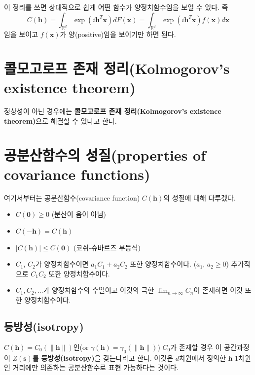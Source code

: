 \documentclass[b5paper,]{book}
\theoremstyle{definition}
\theoremstyle{definition}
\theoremstyle{definition}
\theoremstyle{remark}
\begin{document}
이 정리를 쓰면 상대적으로 쉽게 어떤 함수가 양정치함수임을 보일 수 있다.
즉 \[
C(\mathbf{h}) =\int_{\mathbb{R}^{d}}\exp(i\mathbf{h}^{T}\mathbf{x})dF(\mathbf{x})
=\int_{\mathbb{R}^{d}}\exp(i\mathbf{h}^{T}\mathbf{x})f(\mathbf{x})d\mathbf{x}
\] 임을 보이고 \(f(\mathbf{x})\)가 양(positive)임을 보이기만 하면 된다.

\section{콜모고로프 존재 정리(Kolmogorov's existence
theorem)}\label{--kolmogorovs-existence-theorem}

정상성이 아닌 경우에는 \textbf{콜모고로프 존재 정리(Kolmogorov's
existence theorem)}으로 해결할 수 있다고 한다.

\section{공분산함수의 성질(properties of covariance
functions)}\label{-properties-of-covariance-functions}

여기서부터는 공분산함수(covariance function) \(C(\mathbf{h})\)의 성질에
대해 다루겠다.

\begin{itemize}
\item
  \(C(\mathbf{0}) \geq 0\) (분산이 음이 아님)
\item
  \(C(\mathbf{-h})=C(\mathbf{h})\)
\item
  \(|C(\mathbf{h})| \leq C(\mathbf{0})\) (코쉬-슈바르츠 부등식)
\item
  \(C_{1}\), \(C_{2}\)가 양정치함수이면 \(a_{1}C_{1}+a_{2}C_{2}\) 또한
  양정치함수이다. (\(a_{1}\), \(a_{2} \geq 0\)) 추가적으로
  \(C_{1}C_{2}\) 또한 양정치함수이다.
\item
  \(C_{1}, C_{2}, \ldots\)가 양정치함수의 수열이고 이것의 극한
  \(\lim_{n \rightarrow \infty}C_{n}\)이 존재하면 이것 또한
  양정치함수이다.
\end{itemize}

\subsection{등방성(isotropy)}\label{isotropy}

\(C(\mathbf{h})=C_{0}(\|\mathbf{h}\|)\)인(or
\(\gamma(\mathbf{h})=\gamma_{0}(\|\mathbf{h}\|)\)) \(C_{0}\)가 존재할
경우 이 공간과정이 \(Z(\mathbf{s})\)를 \textbf{등방성(isotropy)}을
갖는다라고 한다. 이것은 \(d\)차원에서 정의한 \(\mathbf{h}\) 1차원인
거리에만 의존하는 공분산함수로 표현 가능하다는 것이다.
\end{document}
